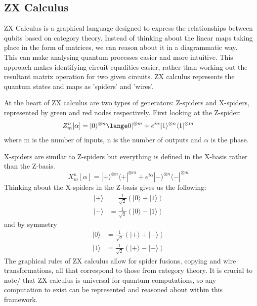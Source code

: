 \documentclass[12pt]{article}
\newcommand{\newp}
    {
    \vskip 0.5cm 
  }
\numberwithin{equation}{section}
\begin{document}
\subsection{ZX Calculus}
ZX Calculus is a graphical language designed to express the relationships between 
qubits based on category theory. Instead of thinking about the linear maps taking place
in the form of matrices, we can reason about it in a diagrammatic way. This 
can make analysing quantum processes easier and more intuitive. This approach 
makes identifying circuit equalities easier, rather than working out the resultant 
matrix operation for two given circuits. ZX calculus represents the quantum states 
and maps as 'spiders' and 'wires'. 
\newp 
At the heart of ZX calculus are two types of generators: Z-spiders and X-spiders,
represented by green and red nodes respectively. First looking at the Z-spider: 
\begin{equation}
  Z^n_m[\alpha] = |0\rangle^{\otimes n}\lange0|^{\otimes m}+e^{i\alpha}
  |1\rangle^{\otimes n}\langle1|^{\otimes m}
\end{equation}
where m is the number of inputs, n is the number of outputs and $\alpha$ is the 
phase.
\newp
X-spiders are similar to Z-spiders but everything is defined in the X-basis rather 
than the Z-basis. 
\begin{equation}
  X^n_m[\alpha] = |+\rangle^{\otimes n}\langle +|^{\otimes m}+e^{i\alpha}| -\rangle 
  ^{\otimes n}\langle - | ^{\otimes m}
\end{equation}
Thinking about the X-spiders in the Z-basis gives us the following: 
\begin{equation}
  \begin{split}
    |+\rangle &= \frac{1}{\sqrt2}(|0\rangle+|1\rangle)\\
    |-\rangle &= \frac{1}{\sqrt2}(|0\rangle-|1\rangle)
  \end{split}
\end{equation}
and by symmetry
\begin{equation}
  \begin{split}
    |0\rangle &= \frac{1}{\sqrt2}(|+\rangle+|-\rangle)\\
    |1\rangle &= \frac{1}{\sqrt2}(|+\rangle-|-\rangle)
  \end{split}
\end{equation}
The graphical rules of ZX calculus allow for spider fusions, copying and wire 
transformations, all that correspond to those from category theory. It is crucial 
to note/ that ZX calculus is universal for quantum computations, so any computation 
to exist can be represented and reasoned about within this framework. 
\end{document}
